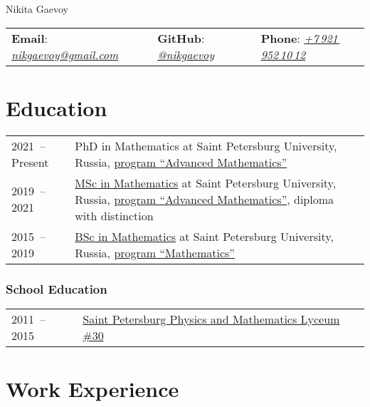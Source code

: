 \documentclass[a4paper, 11pt]{article}
\begin{document}


\begin{center}
	{\Huge Nikita Gaevoy}
\end{center}

\begin{center}
	\begin{tabular}{lll}
		\textbf{Email}: \href{mailto:nikgaevoy@gmail.com}{{\it nikgaevoy@gmail.com}} &
		\hspace{0.13cm} \textbf{GitHub}: \href{https://github.com/nikgaevoy}{{\it @nikgaevoy}} &
		\hspace{0.13cm} \textbf{Phone}: \href{tel:+79219521012}{{\it +7\,921\,952\,10\,12}}
	\end{tabular}
\end{center}

\section*{Education}

\begin{tabularx}{\textwidth}{lX}
	2021~-- Present & PhD in Mathematics at Saint Petersburg University, Russia, \href{https://math-cs.spbu.ru/en/advanced-mathematics/}{program ``Advanced Mathematics''} \\
	2019~-- 2021 & \href{https://diploma.spbu.ru/s/?rn=3121007\&bd=19980122\&h=67a15239b3294582867a44ba9e42cf98}{MSc in Mathematics} at Saint Petersburg University, Russia, \href{https://math-cs.spbu.ru/en/msc-math-en/}{program ``Advanced Mathematics''}, diploma with distinction \\
	2015~-- 2019 & \href{https://diploma.spbu.ru/s/?rn=0911007\&bd=19980122\&h=a34dc3393d004d5fb149a60e3545b673}{BSc in Mathematics} at Saint Petersburg University, Russia, \href{https://math-cs.spbu.ru/en/}{program ``Mathematics''}
\end{tabularx}

\subsubsection*{School Education}

\begin{tabularx}{\textwidth}{lX}
	2011~-- 2015 & \href{http://www.school30.spb.ru/}{Saint Petersburg Physics and Mathematics Lyceum \#30}
\end{tabularx}


\section*{Work Experience}
\end{document}
